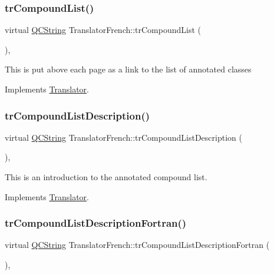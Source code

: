 \subsubsection{\texorpdfstring{trCompoundList()}{trCompoundList()}}
{\footnotesize\ttfamily virtual \mbox{\hyperlink{class_q_c_string}{Q\+C\+String}} Translator\+French\+::tr\+Compound\+List (\begin{DoxyParamCaption}{ }\end{DoxyParamCaption})\hspace{0.3cm}{\ttfamily [inline]}, {\ttfamily [virtual]}}

This is put above each page as a link to the list of annotated classes 

Implements \mbox{\hyperlink{class_translator}{Translator}}.

\mbox{\label{class_translator_french_ae303f55b50df6cc0b6342d022cfad004}} 
\subsubsection{\texorpdfstring{trCompoundListDescription()}{trCompoundListDescription()}}
{\footnotesize\ttfamily virtual \mbox{\hyperlink{class_q_c_string}{Q\+C\+String}} Translator\+French\+::tr\+Compound\+List\+Description (\begin{DoxyParamCaption}{ }\end{DoxyParamCaption})\hspace{0.3cm}{\ttfamily [inline]}, {\ttfamily [virtual]}}

This is an introduction to the annotated compound list. 

Implements \mbox{\hyperlink{class_translator}{Translator}}.

\mbox{\label{class_translator_french_a9cbdaf591fc534cc8874738c2d30bf81}} 
\subsubsection{\texorpdfstring{trCompoundListDescriptionFortran()}{trCompoundListDescriptionFortran()}}
{\footnotesize\ttfamily virtual \mbox{\hyperlink{class_q_c_string}{Q\+C\+String}} Translator\+French\+::tr\+Compound\+List\+Description\+Fortran (\begin{DoxyParamCaption}{ }\end{DoxyParamCaption})\hspace{0.3cm}{\ttfamily [inline]}, {\ttfamily [virtual]}}

